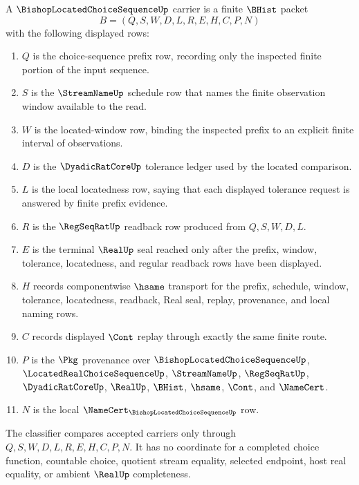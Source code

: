 \begin{definition}
\label{def:bishop-located-choice-sequence-carrier}
A $\BishopLocatedChoiceSequenceUp$ carrier is a finite $\BHist$ packet
$$
B=(Q,S,W,D,L,R,E,H,C,P,N)
$$
with the following displayed rows:
\begin{enumerate}
\item $Q$ is the choice-sequence prefix row, recording only the inspected finite portion of the input sequence.
\item $S$ is the $\StreamNameUp$ schedule row that names the finite observation window available to the read.
\item $W$ is the located-window row, binding the inspected prefix to an explicit finite interval of observations.
\item $D$ is the $\DyadicRatCoreUp$ tolerance ledger used by the located comparison.
\item $L$ is the local locatedness row, saying that each displayed tolerance request is answered by finite prefix evidence.
\item $R$ is the $\RegSeqRatUp$ readback row produced from $Q,S,W,D,L$.
\item $E$ is the terminal $\RealUp$ seal reached only after the prefix, window, tolerance, locatedness, and regular readback rows have been displayed.
\item $H$ records componentwise $\hsame$ transport for the prefix, schedule, window, tolerance, locatedness, readback, Real seal, replay, provenance, and local naming rows.
\item $C$ records displayed $\Cont$ replay through exactly the same finite route.
\item $P$ is the $\Pkg$ provenance over $\BishopLocatedChoiceSequenceUp$, $\LocatedRealChoiceSequenceUp$, $\StreamNameUp$, $\RegSeqRatUp$, $\DyadicRatCoreUp$, $\RealUp$, $\BHist$, $\hsame$, $\Cont$, and $\NameCert$.
\item $N$ is the local $\NameCert_{\BishopLocatedChoiceSequenceUp}$ row.
\end{enumerate}
The classifier compares accepted carriers only through $Q,S,W,D,L,R,E,H,C,P,N$. It has no coordinate for a completed choice function, countable choice, quotient stream equality, selected endpoint, host real equality, or ambient $\RealUp$ completeness.
\end{definition}

